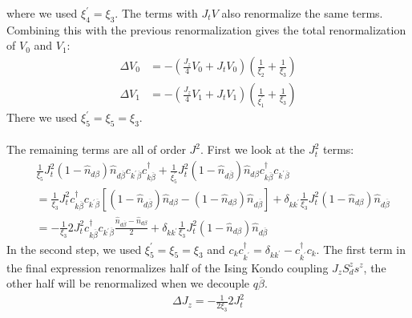 \documentclass[twoside]{report}
\numberwithin{equation}{section}
\begin{document}
where we used \(\xi_4^\prime = \xi_3\). The terms with \(J_t V\) also renormalize the same terms. Combining this with the previous renormalization gives the total renormalization of \(V_0\) and \(V_1\):
\begin{equation}\begin{aligned}
	\label{V}
	\Delta V_0 &= -\left(\frac{J_z}{4}V_0 + J_t V_0\right) \left(\frac{1}{\xi_2} + \frac{1}{\xi_3}\right)\\
	\Delta V_1 &= -\left(\frac{J_z}{4}V_1 + J_t V_1\right) \left(\frac{1}{\xi^\prime_1} + \frac{1}{\xi_3}\right)
\end{aligned}\end{equation}
There we used \(\xi_5^\prime = \xi_5 = \xi_3\).
\\\\The remaining terms are all of order \(J^2\). First we look at the \(J_t^2\) terms:
\begin{equation}\begin{aligned}
&\frac{1}{\xi_5}J_t^2 \left( 1 - \hat n_{d\beta} \right) \hat n_{d\overline\beta} c_{k^\prime\overline\beta}c^\dagger_{k\overline\beta} + \frac{1}{\xi^\prime_5}J_t^2 \left( 1 - \hat n_{d\overline\beta} \right) \hat n_{d\beta} c^\dagger_{k\overline\beta} c_{k^\prime\overline\beta}\\
&=\frac{1}{\xi_3}J_t^2 c^\dagger_{k\overline\beta} c_{k^\prime\overline\beta}\left[\left( 1 - \hat n_{d\overline\beta} \right) \hat n_{d\beta} - \left( 1 - \hat n_{d\beta} \right) \hat n_{d\overline\beta}\right]  + \delta_{kk^\prime} \frac{1}{\xi_3}J_t^2\left( 1 - \hat n_{d\beta} \right) \hat n_{d\overline\beta}\\
&=-\frac{1}{\xi_3}2J_t^2 c^\dagger_{k\overline\beta} c_{k^\prime\overline\beta}\frac{\hat n_{d\overline\beta} - \hat n_{d\beta}}{2}  + \delta_{kk^\prime} \frac{1}{\xi_3}J_t^2\left( 1 - \hat n_{d\beta} \right) \hat n_{d\overline\beta}
\end{aligned}\end{equation}
In the second step, we used \(\xi_5^\prime = \xi_5 = \xi_3\) and \(c_k c^\dagger_{k^\prime} = \delta_{kk^\prime} - c^\dagger_{k^\prime}c_k\). The first term in the final expression renormalizes half of the Ising Kondo coupling \(J_z S^z_d s^z\), the other half will be renormalized when we decouple \(q\overline\beta\).
\begin{equation}\begin{aligned}
	\label{Jz}
	\Delta J_z = -\frac{1}{2\xi_3}2J_t^2
\end{aligned}\end{equation}
\end{document}
